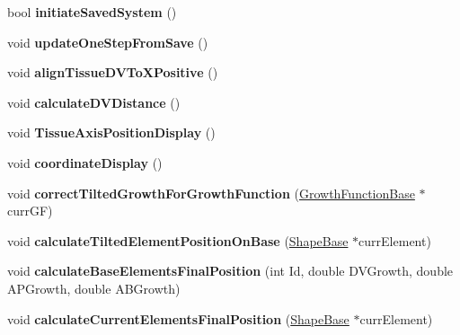 \begin{DoxyCompactItemize}
\item 
\hypertarget{classSimulation_a6ef90fd76ed4f6bb9d063e7e72e9a983}{}bool {\bfseries initiate\+Saved\+System} ()\label{classSimulation_a6ef90fd76ed4f6bb9d063e7e72e9a983}

\item 
\hypertarget{classSimulation_a1f5dbbde572af555225089e247296e2e}{}void {\bfseries update\+One\+Step\+From\+Save} ()\label{classSimulation_a1f5dbbde572af555225089e247296e2e}

\item 
\hypertarget{classSimulation_a91a12f6ac1b230cecbe004221326a7ca}{}void {\bfseries align\+Tissue\+D\+V\+To\+X\+Positive} ()\label{classSimulation_a91a12f6ac1b230cecbe004221326a7ca}

\item 
\hypertarget{classSimulation_a2cdf77d01390a32cabb8ba7535a9f7dd}{}void {\bfseries calculate\+D\+V\+Distance} ()\label{classSimulation_a2cdf77d01390a32cabb8ba7535a9f7dd}

\item 
\hypertarget{classSimulation_abb87948e7b8131fd5d747bf728232db2}{}void {\bfseries Tissue\+Axis\+Position\+Display} ()\label{classSimulation_abb87948e7b8131fd5d747bf728232db2}

\item 
\hypertarget{classSimulation_a1d49a9ab3e83456d86ec5bfcf0d1a804}{}void {\bfseries coordinate\+Display} ()\label{classSimulation_a1d49a9ab3e83456d86ec5bfcf0d1a804}

\item 
\hypertarget{classSimulation_a3b25df63c54a058e6917309aed483e6e}{}void {\bfseries correct\+Tilted\+Growth\+For\+Growth\+Function} (\hyperlink{classGrowthFunctionBase}{Growth\+Function\+Base} $\ast$curr\+G\+F)\label{classSimulation_a3b25df63c54a058e6917309aed483e6e}

\item 
\hypertarget{classSimulation_acbe2603b1eb8b50978f9f1d30f87311c}{}void {\bfseries calculate\+Tilted\+Element\+Position\+On\+Base} (\hyperlink{classShapeBase}{Shape\+Base} $\ast$curr\+Element)\label{classSimulation_acbe2603b1eb8b50978f9f1d30f87311c}

\item 
\hypertarget{classSimulation_aa6e3525243aaf17afe95dc5bd97a124a}{}void {\bfseries calculate\+Base\+Elements\+Final\+Position} (int Id, double D\+V\+Growth, double A\+P\+Growth, double A\+B\+Growth)\label{classSimulation_aa6e3525243aaf17afe95dc5bd97a124a}

\item 
\hypertarget{classSimulation_af6f6e9ee39d12e91957d934a2f1711f9}{}void {\bfseries calculate\+Current\+Elements\+Final\+Position} (\hyperlink{classShapeBase}{Shape\+Base} $\ast$curr\+Element)\label{classSimulation_af6f6e9ee39d12e91957d934a2f1711f9}

\end{DoxyCompactItemize}
